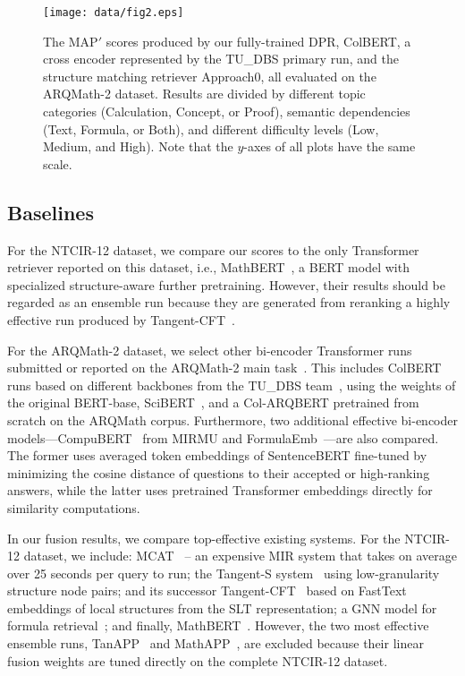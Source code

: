 \documentclass[11pt]{article}
\begin{document}
\begin{figure*}
  \centering
  \hspace*{-0.5in} \texttt{[image: data/fig2.eps]}
  \vspace{-0.1in}
  \caption{The MAP$'$ scores produced by our fully-trained DPR, ColBERT, a cross encoder represented by the TU\_DBS primary run, and the structure matching retriever Approach0, all evaluated on the ARQMath-2 dataset.
  Results are divided by different topic categories (Calculation, Concept, or Proof), semantic dependencies (Text, Formula, or Both), and different difficulty levels (Low, Medium, and High). Note that the $y$-axes of all plots have the same scale.}
  \label{fig:map}
\end{figure*}

\subsection{Baselines}

For the NTCIR-12 dataset, we compare our scores to the only Transformer retriever reported on this dataset, i.e., MathBERT~\cite{peng2021mathbert}, a BERT model with specialized structure-aware further pretraining.
However, their results should be regarded as an ensemble run because they are generated from reranking a highly effective run produced by Tangent-CFT~\cite{mansouri2019tangentcft}.

For the ARQMath-2 dataset, we select other bi-encoder Transformer runs submitted or reported on the ARQMath-2 main task~\cite{mansouri2021arqmath2review}.
This includes ColBERT runs based on different backbones from the TU\_DBS team~\cite{reusch2021tu_dbs}, using the weights of the original BERT-base, SciBERT~\cite{beltagy2019scibert}, and a Col-ARQBERT pretrained from scratch on the ARQMath corpus.
Furthermore, two additional effective bi-encoder models---CompuBERT~\cite{novotny2021ensembling} from MIRMU and FormulaEmb~\cite{indian2021bert}---are also compared.
The former uses averaged token embeddings of SentenceBERT fine-tuned by minimizing the cosine distance of questions to their accepted or high-ranking answers,
while the latter uses pretrained Transformer embeddings directly for similarity computations.

In our fusion results, we compare top-effective existing systems.
For the NTCIR-12 dataset, we include:
MCAT~\cite{kristianto2016mcat} -- an expensive MIR system that takes on average over 25 seconds per query to run;
the Tangent-S system~\cite{davila2017layout} using low-granularity structure node pairs;
and its successor Tangent-CFT~\cite{mansouri2019tangentcft} based on FastText embeddings of local structures from the SLT representation;
a GNN model for formula retrieval~\cite{song2021GNN};
and finally, MathBERT~\cite{peng2021mathbert}.
However, the two most effective ensemble runs, TanAPP~\cite{mansouri2019tangentcft} and MathAPP~\cite{peng2021mathbert}, are excluded because their linear fusion weights are tuned directly on the complete NTCIR-12 dataset. 
\end{document}
